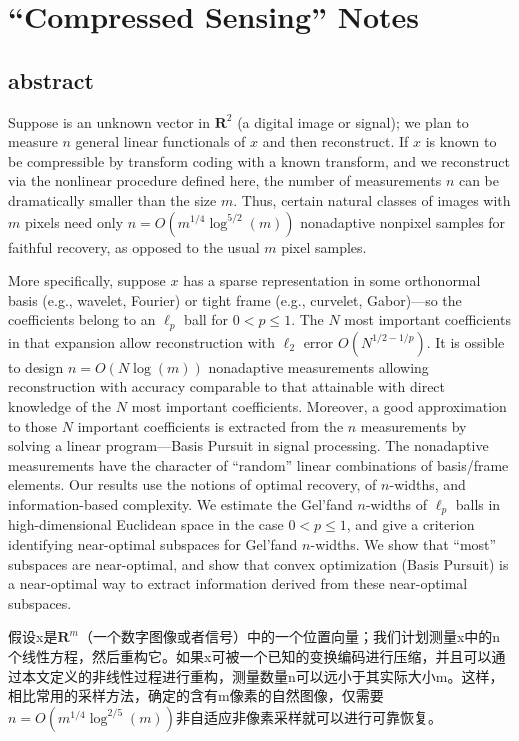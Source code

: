 \chapter{``Compressed Sensing'' Notes}
\label{chapter3}
\section{abstract}
Suppose is an unknown vector in $\mathbf{R}^2$ (a digital image or signal); we plan to measure $n$ general linear functionals of $x$ and then reconstruct. If $x$ is known to be compressible by transform coding with a known transform, and we reconstruct via the nonlinear procedure defined here, the number of measurements $n$ can be dramatically smaller than the size $m$. Thus, certain natural classes of images with $m$ pixels need only $n = O(m^{1/4}\log^{5/2}(m))$ nonadaptive nonpixel samples for faithful recovery, as opposed to the usual $m$ pixel samples.

More specifically, suppose $x$ has a sparse representation in some orthonormal basis (e.g., wavelet, Fourier) or tight frame (e.g., curvelet, Gabor)—so the coefficients belong to an $\ell_p$ ball for $0<p \leq 1$. The $N$ most important coefficients in that expansion allow reconstruction with $\ell_2$ error $O(N^{1/2-1/p})$. It is ossible to design \textcolor[rgb]{1,0,0}{$n=O(N\log(m))$ nonadaptive measurements} allowing reconstruction with accuracy comparable to that attainable with direct knowledge of the $N$ most important coefficients. Moreover, a good approximation to those $N$ important coefficients is extracted from the $n$ measurements by solving a linear program—Basis Pursuit in signal processing. The nonadaptive measurements have the character of “random” linear combinations of basis/frame elements. Our results use the notions of optimal recovery, of $n$-widths, and information-based complexity. We estimate the Gel'fand $n$-widths of $\ell_p$ balls in high-dimensional Euclidean space in the case $0<p \leq 1$, and give a criterion identifying near-optimal subspaces for Gel'fand $n$-widths. We show that “most” subspaces are near-optimal, and show that convex optimization (Basis Pursuit) is a near-optimal way to extract information derived from these near-optimal subspaces.

    假设x是$\mathbf{R}^m$（一个数字图像或者信号）中的一个位置向量；我们计划测量x中的n个线性方程，然后重构它。如果x可被一个已知的变换编码进行压缩，并且可以通过本文定义的非线性过程进行重构，测量数量n可以远小于其实际大小m。这样，相比常用的采样方法，确定的含有m像素的自然图像，仅需要$n=O(m^{1/4}\log^{2/5}(m))$非自适应非像素采样就可以进行可靠恢复。
	
